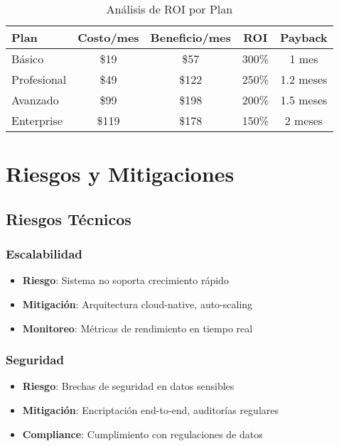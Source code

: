 \documentclass[12pt,a4paper]{article}
\begin{document}
\begin{table}[H]
\centering
\begin{tabular}{|l|c|c|c|c|}
\hline
\textbf{Plan} & \textbf{Costo/mes} & \textbf{Beneficio/mes} & \textbf{ROI} & \textbf{Payback} \\
\hline
Básico & \$19 & \$57 & 300\% & 1 mes \\
\hline
Profesional & \$49 & \$122 & 250\% & 1.2 meses \\
\hline
Avanzado & \$99 & \$198 & 200\% & 1.5 meses \\
\hline
Enterprise & \$119 & \$178 & 150\% & 2 meses \\
\hline
\end{tabular}
\caption{Análisis de ROI por Plan}
\end{table}

\section{Riesgos y Mitigaciones}

\subsection{Riesgos Técnicos}

\subsubsection{Escalabilidad}

\begin{itemize}
    \item \textbf{Riesgo}: Sistema no soporta crecimiento rápido
    \item \textbf{Mitigación}: Arquitectura cloud-native, auto-scaling
    \item \textbf{Monitoreo}: Métricas de rendimiento en tiempo real
\end{itemize}

\subsubsection{Seguridad}

\begin{itemize}
    \item \textbf{Riesgo}: Brechas de seguridad en datos sensibles
    \item \textbf{Mitigación}: Encriptación end-to-end, auditorías regulares
    \item \textbf{Compliance}: Cumplimiento con regulaciones de datos
\end{itemize}
\end{document}
